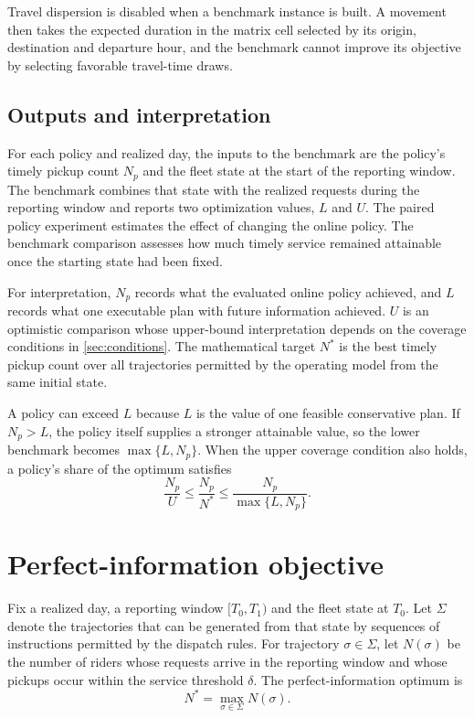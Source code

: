 Travel dispersion is disabled when a benchmark instance is built. A movement then takes the expected
duration in the matrix cell selected by its origin, destination and departure hour, and the benchmark
cannot improve its objective by selecting favorable travel-time draws.

\subsection{Outputs and interpretation}

For each policy and realized day, the inputs to the benchmark are the policy's timely pickup count
$N_p$ and the fleet state at the start of the reporting window. The benchmark combines that state with
the realized requests during the reporting window and reports two optimization values, $L$ and $U$.
The paired policy experiment estimates the effect of changing the online policy. The benchmark
comparison assesses how much timely service remained attainable once the starting state had been fixed.

For interpretation, $N_p$ records what the evaluated online policy achieved, and $L$ records what one
executable plan with future information achieved. $U$ is an optimistic comparison whose upper-bound
interpretation depends on the coverage conditions in \cref{sec:conditions}. The mathematical target
$N^*$ is the best timely pickup count over all trajectories permitted by the operating model from the
same initial state.

A policy can exceed $L$ because $L$ is the value of one feasible conservative plan. If $N_p>L$, the
policy itself supplies a stronger attainable value, so the lower benchmark becomes $\max\{L,N_p\}$.
When the upper coverage condition also holds, a policy's share of the optimum satisfies
\begin{equation}
  \frac{N_p}{U}
  \leq
  \frac{N_p}{N^*}
  \leq
  \frac{N_p}{\max\{L,N_p\}}.
  \label{eq:share}
\end{equation}

\section{Perfect-information objective}
\label{sec:objective}

Fix a realized day, a reporting window $[T_0,T_1)$ and the fleet state at $T_0$. Let $\Sigma$ denote
the trajectories that can be generated from that state by sequences of instructions permitted by the
dispatch rules. For trajectory $\sigma\in\Sigma$, let $N(\sigma)$ be the number of riders whose requests
arrive in the reporting window and whose pickups occur within the service threshold $\delta$. The
perfect-information optimum is
\begin{equation}
  N^* = \max_{\sigma\in\Sigma} N(\sigma).
  \label{eq:nstar}
\end{equation}

